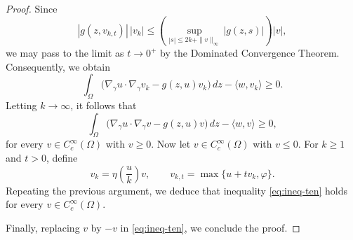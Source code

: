 \documentclass[11pt]{article}
\newcommand{\gradgr}{\nabla_{\gamma}}
\begin{document}
\begin{proof}
Since
\begin{equation*}
|g(z,v_{k,t})|\,|v_k|
\le
\left(
\sup_{|s|\le 2k + \|v\|_\infty}
|g(z,s)|
\right)
|v|,
\end{equation*}
we may pass to the limit as $t \to 0^{+}$ by the Dominated Convergence Theorem. Consequently, we obtain
\begin{equation*}
\int_\Omega
\big(
\gradgr u \cdot \gradgr v_k
-
g(z,u) v_k
\big)\,dz
-
\langle w , v_k \rangle
\ge 0 .
\end{equation*}
Letting $k \to \infty$, it follows that
\begin{equation}
\label{eq:ineq-ten}
\int_\Omega
\big(
\gradgr u \cdot \gradgr v
-
g(z,u) v
\big)\,dz
-
\langle w , v \rangle
\ge 0 ,
\end{equation}
for every $v \in C_c^\infty(\Omega)$ with $v \ge 0$. Now let $v \in C_c^\infty(\Omega)$ with $v \le 0$. For $k \ge 1$ and $t > 0$, define
\begin{equation*}
v_k = \eta\!\left( \frac{u}{k} \right) v,
\qquad
v_{k,t} = \max \{ u + t v_k , \varphi \}.
\end{equation*}
Repeating the previous argument, we deduce that inequality
\eqref{eq:ineq-ten} holds for every $v \in C_c^\infty(\Omega)$.

Finally, replacing $v$ by $-v$ in \eqref{eq:ineq-ten}, we conclude the proof.
\end{proof}
\end{document}
